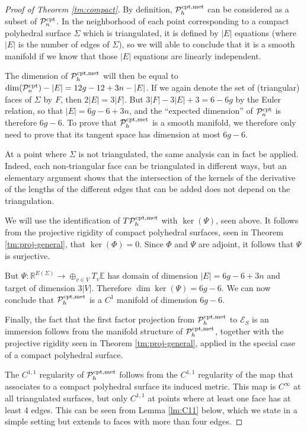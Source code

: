 \documentclass[notitlepage,twoside,a4paper]{amsart}
\newcommand{\Pcomet}{\cP^{\rm cpt,met}_{h}}
\newcommand{\Pcon}{\cP^{\rm cpt}_{n}}
\theoremstyle{named}
\newcommand{\R}{{\mathbb R}}
\newcommand{\bE}{{\mathbb E}}
\newcommand{\cE}{{\mathcal E}}
\newcommand{\cP}{{\mathcal P}}
\begin{document}
\begin{proof}[Proof of Theorem \ref{tm:compact}]
  By definition, $\Pcomet$ can be considered as a subset of $\Pcon$. In the neighborhood of each point corresponding to a compact polyhedral surface $\Sigma$ which is triangulated, it is defined by $|E|$ equations (where $|E|$ is the number of edges of $\Sigma$), so we will able to conclude that it is a smooth manifold if we know that those $|E|$ equations are linearly independent.

  The dimension of $\Pcomet$ will then be equal to $\dim(\Pcon)-|E|=12g-12+3n-|E|$. If we again denote the set of (triangular) faces of $\Sigma$ by $F$, then $2|E| = 3|F|$. But $3|F|-3|E|+3=6-6g$ by the Euler relation, so that $|E|=6g-6+3n$, and the ``expected dimension'' of $\Pcon$ is therefore $6g-6$. To prove that $\Pcomet$ is a smooth manifold, we therefore only need to prove that its tangent space has dimension at most $6g-6$.

  At a point where $\Sigma$ is not triangulated, the same analysis can in fact be applied. Indeed, each non-triangular face can be triangulated in different ways, but an elementary argument shows that the intersection of the kernels of the derivative of the lengths of the different edges that can be added does not depend on the triangulation.
  
  We will use the identification of $T\Pcomet$ with $\ker(\Psi)$, seen above. It follows from the projective rigidity of compact polyhedral surfaces, seen in Theorem \ref{tm:proj-general}, that $\ker(\Phi)=0$. Since $\Phi$ and  $\Psi$ are adjoint, it follows that $\Psi$ is surjective.

  But $\Psi: \R^{E(\Sigma)} \to \oplus_{v\in V}T_v\bE$ has domain of dimension $|E|=6g-6+3n$ and target of dimension $3|V|$. Therefore $\dim \ker(\Psi)=6g-6$. We can now conclude that $\Pcomet$ is a $C^1$ manifold of dimension $6g-6$.

  Finally, the fact that the first factor projection from $\Pcomet$ to $\cE_S$ is an immersion follows from the manifold structure of $\Pcomet$, together with the projective rigidity seen in Theorem \ref{tm:proj-general}, applied in the special case of a compact polyhedral surface.

  The $C^{1,1}$ regularity of $\Pcomet$ follows from the $C^{1,1}$ regularity of the map that associates to a compact polyhedral surface its induced metric. This map is $C^{\infty}$ at all triangulated surfaces, but only $C^{1,1}$ at points where at least one face has at least 4 edges. This can be seen from Lemma \ref{lm:C11} below, which we state in a simple setting but extends to faces with more than four edges.
\end{proof}
\end{document}
